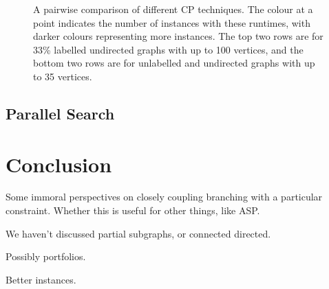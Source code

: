 \documentclass{llncs}
\begin{document}
\begin{figure}[p]
    \centering
    
    \caption{A pairwise comparison of different CP techniques. The colour at a point indicates the
    number of instances with these runtimes, with darker colours representing more instances. The
    top two rows are for 33\% labelled undirected graphs with up to 100 vertices, and the bottom two
    rows are for unlabelled and undirected graphs with up to 35 vertices.}
        \label{figure:connected-cp}
\end{figure}

\subsection{Parallel Search}

\cite{DBLP:conf/ictai/MinotNS15}

\section{Conclusion}

Some immoral perspectives on closely coupling branching with a particular constraint. Whether this
is useful for other things, like ASP.

We haven't discussed partial subgraphs, or connected directed.

Possibly portfolios.

Better instances.

\FloatBarrier


\end{document}
